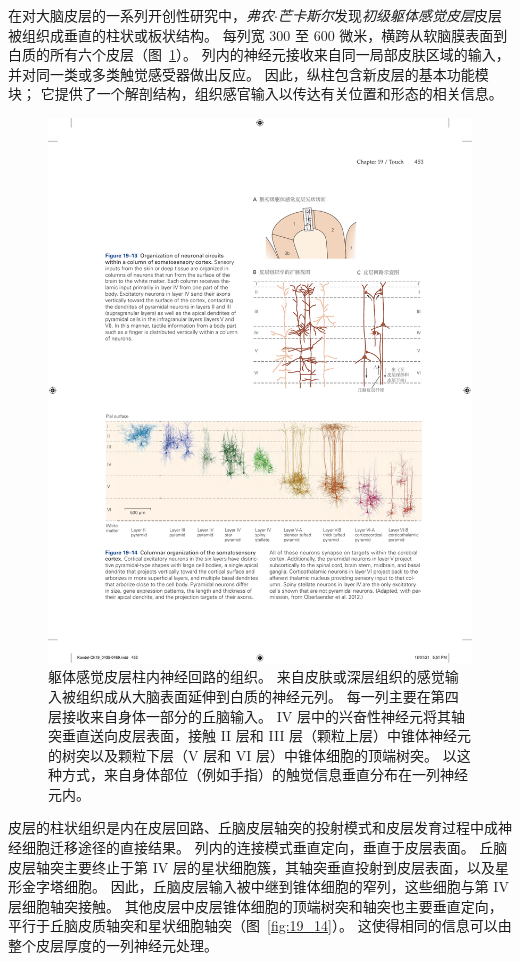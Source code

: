 在对大脑皮层的一系列开创性研究中，\textit{弗农$\cdot$芒卡斯尔}发现\textit{初级躯体感觉皮层}皮层被组织成垂直的柱状或板状结构。
每列宽 300 至 600 微米，横跨从软脑膜表面到白质的所有六个皮层（图~\ref{fig:19_13}）。
列内的神经元接收来自同一局部皮肤区域的输入，并对同一类或多类触觉感受器做出反应。
因此，纵柱包含新皮层的基本功能模块；
它提供了一个解剖结构，组织感官输入以传达有关位置和形态的相关信息。


\begin{figure}[htbp]
	\centering
	\includegraphics[width=0.75\linewidth]{chap19/fig_19_13}
	\caption{躯体感觉皮层柱内神经回路的组织。
		来自皮肤或深层组织的感觉输入被组织成从大脑表面延伸到白质的神经元列。
		每一列主要在第四层接收来自身体一部分的丘脑输入。
		IV 层中的兴奋性神经元将其轴突垂直送向皮层表面，接触 II 层和 III 层（颗粒上层）中锥体神经元的树突以及颗粒下层（V 层和 VI 层）中锥体细胞的顶端树突。
		以这种方式，来自身体部位（例如手指）的触觉信息垂直分布在一列神经元内。}
	\label{fig:19_13}
\end{figure}


皮层的柱状组织是内在皮层回路、丘脑皮层轴突的投射模式和皮层发育过程中成神经细胞迁移途径的直接结果。
列内的连接模式垂直定向，垂直于皮层表面。
丘脑皮层轴突主要终止于第 IV 层的星状细胞簇，其轴突垂直投射到皮层表面，以及星形金字塔细胞。
因此，丘脑皮层输入被中继到锥体细胞的窄列，这些细胞与第 IV 层细胞轴突接触。
其他皮层中皮层锥体细胞的顶端树突和轴突也主要垂直定向，平行于丘脑皮质轴突和星状细胞轴突（图~\ref{fig:19_14}）。
这使得相同的信息可以由整个皮层厚度的一列神经元处理。


